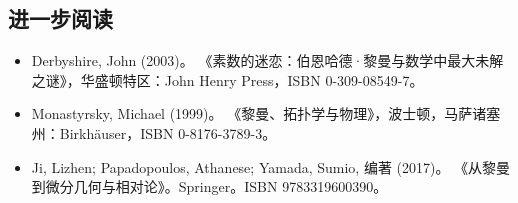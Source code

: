 \subsection{进一步阅读}
\begin{itemize}
\item Derbyshire, John (2003)。 《素数的迷恋：伯恩哈德·黎曼与数学中最大未解之谜》，华盛顿特区：John Henry Press，ISBN 0-309-08549-7。
\item Monastyrsky, Michael (1999)。 《黎曼、拓扑学与物理》，波士顿，马萨诸塞州：Birkhäuser，ISBN 0-8176-3789-3。
\item Ji, Lizhen; Papadopoulos, Athanese; Yamada, Sumio, 编著 (2017)。 《从黎曼到微分几何与相对论》。Springer。ISBN 9783319600390。
\end{itemize}